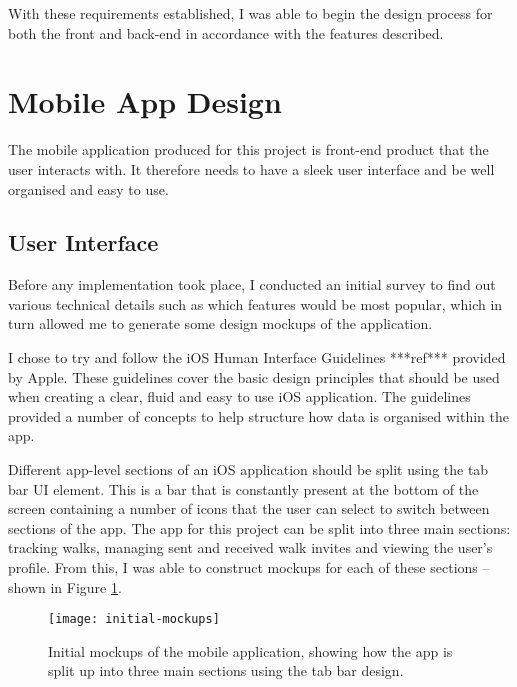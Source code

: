 With these requirements established, I was able to begin the design process for both the front and back-end in accordance with the features described.

\section{Mobile App Design}


The mobile application produced for this project is front-end product that the user interacts with. It therefore needs to have a sleek user interface and be well organised and easy to use.

\subsection{User Interface} \label{subsection:user-interface}

Before any implementation took place, I conducted an initial survey to find out various technical details such as which features would be most popular, which in turn allowed me to generate some design mockups of the application.

I chose to try and follow the iOS Human Interface Guidelines ***ref*** provided by Apple. These guidelines cover the basic design principles that should be used when creating a clear, fluid and easy to use iOS application. The guidelines provided a number of concepts to help structure how data is organised within the app.

Different app-level sections of an iOS application should be split using the tab bar UI element. This is a bar that is constantly present at the bottom of the screen containing a number of icons that the user can select to switch between sections of the app. The app for this project can be split into three main sections: tracking walks, managing sent and received walk invites and viewing the user's profile. From this, I was able to construct mockups for each of these sections -- shown in Figure \ref{fig:initial-mockups}.

\begin{figure}[hbt]
  \centering
  \texttt{[image: initial-mockups]}
  \caption{Initial mockups of the mobile application, showing how the app is split up into three main sections using the tab bar design.}
  \label{fig:initial-mockups}
\end{figure}

